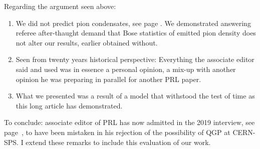 Regarding the argument seen above: 
\begin{enumerate}
\item We did not predict pion condensates, see page \pageref{HeinzBose}. We demonstrated answering referee after-thaught demand that Bose statistics of emitted pion density does not alter our results, earlier obtained without. 
\item
Seen from twenty years historical perspective: 
Everything the associate editor said and used was in essence a personal opinion,  a mix-up with another opinion he was preparing in parallel for another PRL paper.
\item
What we presented  was a result of a model that withstood the test of time as this long article has demonstrated.  
\end{enumerate}
To conclude: associate editor of PRL has now admitted in the 2019 interview, see page~\pageref{Heinz2019}, to have been mistaken in his rejection of the possibility of QGP at CERN-SPS. I extend these remarks to include this evaluation of our work.
 
